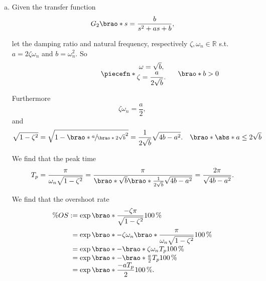 \documentclass[12pt]{article}
\DeclarePairedDelimiter\brao()%
\DeclarePairedDelimiter\abs||
\DeclarePairedDelimiter\piecefn\{.
\begin{document}
\begin{enumerate}[(a)]
    \item
        Given the transfer function
        \begin{equation}
            G_2\brao*s = \frac{b}{s^2 + as + b},
        \end{equation}
        
        let the damping ratio and natural frequency, respectively $\zeta, \omega_n \in \mathbb{R}$ s.t. $a = 2\zeta\omega_n$ and $b = \omega_n^2$. So
        \begin{equation}
            \piecefn*{
                \begin{matrix}
                    \omega = \sqrt{b}\rlap, \\*
                    \zeta = \dfrac{a}{2\sqrt{b}}\rlap. \\*
                \end{matrix}
            }\rlap{$\qquad\brao*{b > 0}$}
        \end{equation}

        Furthermore
        \begin{equation}
            \zeta\omega_n = \frac{a}2,
        \end{equation}
        and
        \begin{equation}
            \sqrt{1 - \zeta^2} = \sqrt{1 - \brao*{\sfrac{a}{\brao*{2\sqrt{b}}}}^2} = \frac{1}{2\sqrt{b}} \sqrt{4b - a^2}.%
            \hskip1em\brao*{\abs*{a} \leq 2\sqrt{b}}
        \end{equation}
        
        We find that the peak time
        \begin{equation}\label{eq:peak time}
            T_p = \frac\pi{\omega_n \sqrt{1 - \zeta^2}} = \frac\pi{\brao*{\sqrt{b}}\brao*{ \frac{1}{2\sqrt{b}}\sqrt{4b - a^2}}} = \frac{2\pi}{\sqrt{4b - a^2}}.
        \end{equation}

        We find that the overshoot rate
        \begin{equation}\label{eq:overshoot}
            \begin{array}{*2{@{}r}@{}l@{}}
                \% OS
                &{}:={}& \exp\brao*{\dfrac{-\zeta\pi}{\sqrt{1 - \zeta^2}}} \SI{100}\percent
            \\*[1.3em]
                &{}={}& \exp\brao*{-\zeta\omega_n\brao*{\dfrac{\pi}{\omega_n\sqrt{1 - \zeta^2}}}} \SI{100}\percent
            \\*
                &{}={}& \exp\brao*{-\brao*{\zeta\omega_n}^{\vphantom{1}}T_p} \SI{100}\percent
            \\*
                &{}={}& \exp\brao*{-\brao*{\tfrac{a}2}^{\vphantom{1}}T_p} \SI{100}\percent
            \\*
                & {}={} & \exp\brao*{\dfrac{-aT_p}{2}} \SI{100}\percent\rlap.
            \\*
            \end{array}
        \end{equation}


\end{enumerate}
\end{document}
